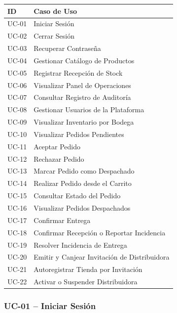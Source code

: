 \documentclass[12pt,a4paper]{report}
\begin{document}
\begin{longtable}{|p{2cm}|p{12cm}|}
\hline
\textbf{ID} & \textbf{Caso de Uso} \\ \hline
UC-01 & Iniciar Sesión \\ \hline
UC-02 & Cerrar Sesión \\ \hline
UC-03 & Recuperar Contraseña \\ \hline
UC-04 & Gestionar Catálogo de Productos \\ \hline
UC-05 & Registrar Recepción de Stock \\ \hline
UC-06 & Visualizar Panel de Operaciones \\ \hline
UC-07 & Consultar Registro de Auditoría \\ \hline
UC-08 & Gestionar Usuarios de la Plataforma \\ \hline
UC-09 & Visualizar Inventario por Bodega \\ \hline
UC-10 & Visualizar Pedidos Pendientes \\ \hline
UC-11 & Aceptar Pedido \\ \hline
UC-12 & Rechazar Pedido \\ \hline
UC-13 & Marcar Pedido como Despachado \\ \hline
UC-14 & Realizar Pedido desde el Carrito \\ \hline
UC-15 & Consultar Estado del Pedido \\ \hline
UC-16 & Visualizar Pedidos Despachados \\ \hline
UC-17 & Confirmar Entrega \\ \hline
UC-18 & Confirmar Recepción o Reportar Incidencia \\ \hline
UC-19 & Resolver Incidencia de Entrega \\ \hline
UC-20 & Emitir y Canjear Invitación de Distribuidora \\ \hline
UC-21 & Autoregistrar Tienda por Invitación \\ \hline
UC-22 & Activar o Suspender Distribuidora \\ \hline
\end{longtable}

\subsubsection{UC-01 -- Iniciar Sesión}
\end{document}

